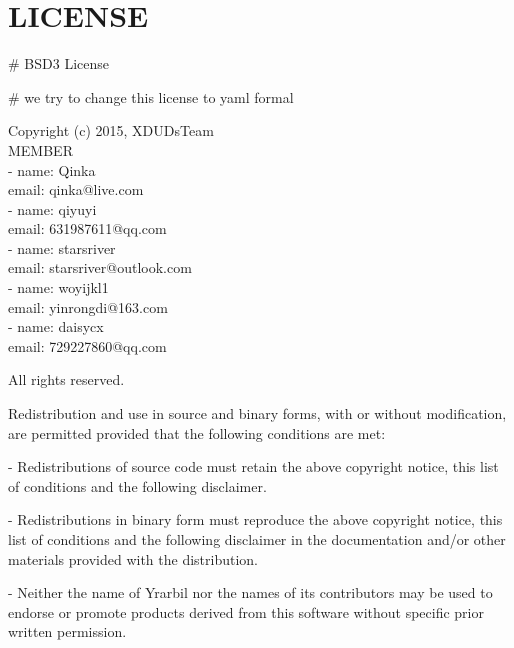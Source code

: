 \section*{LICENSE}\label{license}
\# BSD3 License

\# we try to change this license to yaml formal

\def\qqquad{\quad \qquad}
Copyright (c) 2015, XDUDsTeam \\
  \hspace*{4em} MEMBER\\
  \hspace*{6em} - name: Qinka\\
  \hspace*{6.75em}email: qinka@live.com\\
  \hspace*{6em} - name: qiyuyi\\
  \hspace*{6.75em}email: 631987611@qq.com\\
  \hspace*{6em} - name: starsriver\\
  \hspace*{6.75em}email: starsriver@outlook.com\\
  \hspace*{6em} - name: woyijkl1\\
  \hspace*{6.75em}email: yinrongdi@163.com\\
  \hspace*{6em} - name: daisycx \\
  \hspace*{6.75em}email: 729227860@qq.com
\vspace{0.5em}

All rights reserved.
\vspace*{0.5em}

Redistribution and use in source and binary forms, with or without
modification, are permitted provided that the following conditions are met:
\vspace{.5em}

- Redistributions of source code must retain the above copyright notice, this
  list of conditions and the following disclaimer.
\par \vspace{0.25em}
- Redistributions in binary form must reproduce the above copyright notice,
  this list of conditions and the following disclaimer in the documentation
  and/or other materials provided with the distribution.
\par \vspace{0.25em}
- Neither the name of Yrarbil nor the names of its
  contributors may be used to endorse or promote products derived from
  this software without specific prior written permission.

